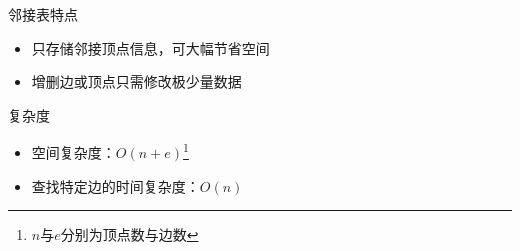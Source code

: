 \begin{frame}
    \frametitle{\insertsectionhead}
    \begin{exampleblock}{邻接表特点}
        \begin{itemize}
            \item 只存储邻接顶点信息，可大幅节省空间
            \item 增删边或顶点只需修改极少量数据
        \end{itemize}
    \end{exampleblock}
    \begin{exampleblock}{复杂度}
        \begin{itemize}
            \item 空间复杂度：$O(n+e)$\footnote{$n$与$e$分别为顶点数与边数}
            \item 查找特定边的时间复杂度：$O(n)$
        \end{itemize}
    \end{exampleblock}
\end{frame}